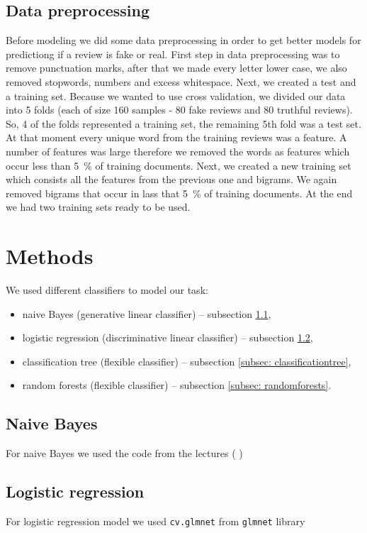 \documentclass[a4paper,11pt]{article}
\begin{document}
\subsection{Data preprocessing}
Before modeling we did some data preprocessing in order to get better models for predictiong if a review is fake or real. First step in data preprocessing was to remove punctuation marks, after that we made every letter lower case, we also removed stopwords, numbers and excess whitespace. Next, we created a test and a training set. Because we wanted to use cross validation, we divided our data into 5 folds (each of size 160 samples - 80 fake reviews and 80 truthful reviews). So, 4 of the folds represented a training set, the remaining 5th fold was a test set. At that moment every unique word from the training reviews was a feature.  A number of features was large %
therefore we removed the words as features which occur less than 5~\% of training documents. Next, we created a new training set which consists all the features from the previous one and bigrams. We again removed bigrams that occur in lass that  5~\% of training documents. At the end we had two training sets ready to be used. 

\section{Methods}
We used different classifiers to model our task:
\begin{itemize}
	\item naive Bayes (generative linear classifier) -- subsection \ref{subsec: naivebayes},
	\item logistic regression (discriminative linear classifier) -- subsection \ref{subsec: logisticregression},
	\item classification tree (flexible classifier) -- subsection \ref{subsec: classificationtree},
	\item random forests (flexible classifier) -- subsection \ref{subsec: randomforests}.
\end{itemize}

\subsection{Naive Bayes}
\label{subsec: naivebayes}
For naive Bayes we used the code from the lectures (%
) 

\subsection{Logistic regression}
\label{subsec: logisticregression}
For logistic regression model we used \verb|cv.glmnet| from \verb|glmnet| library
\end{document}
